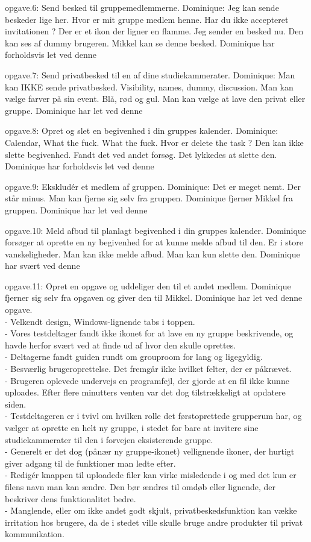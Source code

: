 \documentclass[12pt]{article}
\begin{document}
opgave.6: Send besked til gruppemedlemmerne.
Dominique: Jeg kan sende beskeder lige her. Hvor er mit gruppe medlem henne. Har du ikke accepteret invitationen ? Der er et ikon der ligner en flamme. Jeg sender en besked nu. Den kan ses af dummy brugeren. Mikkel kan se denne besked.
Dominique har forholdsvis let ved denne 

opgave.7: Send privatbesked til en af dine studiekammerater.
Dominique: Man kan IKKE sende privatbesked.
Visibility, names, dummy, discussion. Man kan vælge farver på sin event. Blå, rød og gul. Man kan vælge at lave den privat eller gruppe.
Dominique har let ved denne 

opgave.8: Opret og slet en begivenhed i din gruppes kalender.
Dominique: Calendar, What the fuck. What the fuck. Hvor er delete the task ? Den kan ikke slette begivenhed. Fandt det ved andet forsøg. Det lykkedes at slette den.
Dominique har forholdsvis let ved denne 

opgave.9: Ekskludér et medlem af gruppen.
Dominique: Det er meget nemt. Der står minus. Man kan fjerne sig selv fra gruppen. Dominique fjerner Mikkel fra gruppen.
Dominique har let ved denne 

opgave.10: Meld afbud til planlagt begivenhed i din gruppes kalender.
Dominique forsøger at oprette en ny begivenhed for at kunne melde afbud til den. Er i store vanskeligheder. Man kan ikke melde afbud. Man kan kun slette den.
Dominique har svært ved denne 

opgave.11: Opret en opgave og uddeliger den til et andet medlem.
Dominique fjerner sig selv fra opgaven og giver den til Mikkel.
Dominique har let ved denne opgave.\\

- Velkendt design, Windows-lignende tabs i toppen.\\
- Vores testdeltager fandt ikke ikonet for at lave en ny gruppe beskrivende, og havde herfor svært ved at finde ud af hvor den skulle oprettes.\\
- Deltagerne fandt guiden rundt om grouproom for lang og ligegyldig.\\
- Besværlig brugeroprettelse. Det fremgår ikke hvilket felter, der er påkrævet.\\
- Brugeren oplevede undervejs en programfejl, der gjorde at en fil ikke kunne uploades. Efter flere minutters venten var det dog tilstrækkeligt at opdatere siden.\\
- Testdeltageren er i tvivl om hvilken rolle det førstoprettede grupperum har, og vælger at oprette en helt ny gruppe, i stedet for bare at invitere sine studiekammerater til den i forvejen eksisterende gruppe.\\
- Generelt er det dog (pånær ny gruppe-ikonet) vellignende ikoner, der hurtigt giver adgang til de funktioner man ledte efter. \\
- Redigér knappen til uploadede filer kan virke misledende i og med det kun er filens navn man kan ændre. Den bør ændres til omdøb eller lignende, der beskriver dens funktionalitet bedre.\\
- Manglende, eller om ikke andet godt skjult, privatbeskedsfunktion kan vække irritation hos brugere, da de i stedet ville skulle bruge andre produkter til privat kommunikation.\\
\end{document}
